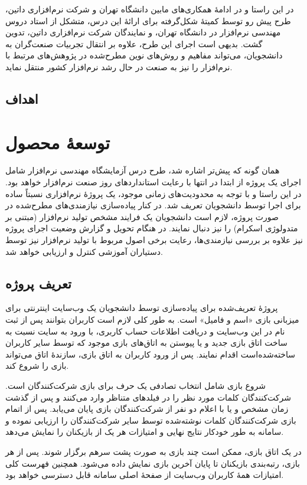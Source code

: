 \documentclass[a4paper,notitlepage]{report}
\begin{document}
در این راستا و در ادامهٔ همکاری‌های مابین دانشگاه تهران و شرکت نرم‌افزاری داتین، طرح پیش رو توسط کمیتهٔ شکل‌گرفته برای ارائهٔ این درس،
متشکل از استاد دروس مهندسی نرم‌افزار در دانشگاه تهران، و نمایندگان شرکت نرم‌افزاری داتین، تدوین گشت.
بدیهی است اجرای این طرح، علاوه بر  انتقال تجربیات صنعت‌گران به دانشجویان، می‌تواند مفاهیم و روش‌های نوین مطرح‌شده در پژوهش‌های مرتبط با نرم‌افزار را نیز
به صنعت در حال رشد نرم‌افزار کشور منتقل نماید.
\section{اهداف}
\chapter{توسعهٔ محصول}
همان گونه که پیش‌تر اشاره شد، طرح درس آزمایشگاه مهندسی نرم‌افزار شامل اجرای یک پروژه از ابتدا در انتها با رعایت استانداردهای روز صنعت نرم‌افزار خواهد بود.
در این راستا و با توجه به محدودیت‌های زمانی موجود، یک پروژهٔ نرم‌افزاری نسبتاً ساده برای اجرا توسط دانشجویان تعریف شد.
در کنار پیاده‌سازی نیازمندی‌های مطرح‌شده در صورت پروژه، لازم است دانشجویان یک فرایند مشخص تولید نرم‌افزار (مبتنی بر متدولوژی اسکرام) را نیز دنبال نمایند.
در هنگام تحویل و گزارش وضعیت اجرای پروژه نیز علاوه بر بررسی نیازمندی‌ها، رعایت برخی اصول مربوط با تولید نرم‌افزار نیز توسط دستیاران آموزشی کنترل و ارزیابی خواهد شد.
\section{تعریف پروژه}
پروژهٔ تعریف‌شده برای پیاده‌سازی توسط دانشجویان یک وب‌سایت اینترنتی برای میزبانی بازی «اسم و فامیل» است.
به طور کلی لازم است کاربران بتوانند پس از ثبت نام در این وب‌سایت و دریافت اطلاعات حساب کاربری، با ورود به سایت
نسبت به ساخت اتاق بازی جدید و یا پیوستن به اتاق‌های بازی موجود که توسط سایر کاربران ساخته‌شده‌است اقدام نمایند.
پس از ورود کاربران به اتاق بازی، سازندهٔ اتاق می‌تواند بازی را شروع کند.

شروع بازی شامل انتخاب تصادفی یک حرف برای بازی شرکت‌کنندگان است.
شرکت‌کنندگان کلمات مورد نظر را در فیلدهای متناظر وارد می‌کنند و پس از گذشت زمان مشخص و یا با اعلام دو نفر از شرکت‌کنندگان بازی پایان می‌یابد.
پس از اتمام بازی شرکت‌کنندگان کلمات نوشته‌شده توسط سایر شرکت‌کنندگان را ارزیابی نموده و سامانه به طور خودکار نتایج نهایی و امتیازات هر یک از بازیکنان را نمایش می‌دهد.

در یک اتاق بازی، ممکن است چند بازی به صورت پشت سرهم برگزار شوند.
پس از هر بازی، رتبه‌بندی بازیکنان تا پایان آخرین بازی نمایش داده می‌شود.
همچنین فهرست کلی امتیازات همهٔ کاربران وب‌سایت از صفحهٔ اصلی سامانه قابل دسترسی خواهد بود.
\end{document}
